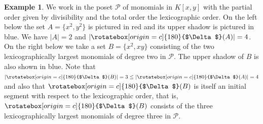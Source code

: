 \documentclass[11pt, reqno]{amsart}
\newcommand{\cP}{{\mathcal P}}
\newcommand{\uSdw}{\rotatebox[origin=c]{180}{$\Delta$}}
\theoremstyle{plain} %
\theoremstyle{definition}
\newtheorem{ex}[thm]{Example}
\theoremstyle{remark}
\numberwithin{equation}{section}  %
\begin{document}
\begin{ex} We work in the poset $\cP$ of monomials in $K[x,y]$  with the partial order given by divisibility and the total order  the lexicographic order. On the left below the set $A=\{x^2,y^2\}$ is pictured in red and its upper shadow is pictured in blue. We have $|A|=2$ and $|\uSdw(A)|=4$. On the right below we take a set $B=\{x^2,xy\}$ consisting of the two lexicographically largest monomials of degree two in $\cP$. The upper shadow of $B$ is also shown in blue. Note that $|\uSdw(B)|=3\leq |\uSdw(A)|=4$ and also that $\uSdw(B)$ is itself an initial segment with respect to the lexicographic order, that is, $\uSdw(B)$ consists of the three lexicographically largest monomials of degree three in $\cP$.

\end{ex}
\end{document}
